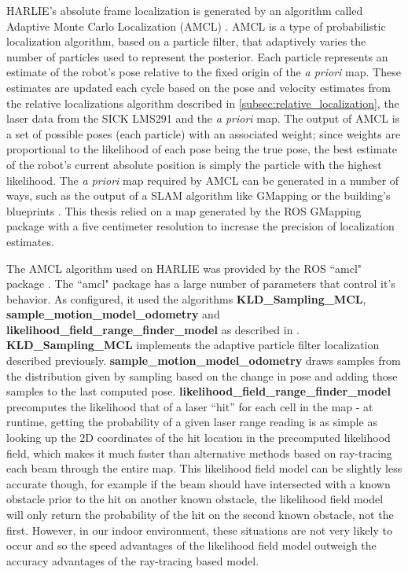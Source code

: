 HARLIE's absolute frame localization is generated by an algorithm called Adaptive Monte Carlo Localization (AMCL) \autocites{Dellaert_1999_533}{Fox01122003}{ProbRobotics}. AMCL is a type of probabilistic localization algorithm, based on a particle filter, that adaptively varies the number of particles used to represent the posterior. Each particle represents an estimate of the robot's pose relative to the fixed origin of the \emph{a priori} map. These estimates are updated each cycle based on the pose and velocity estimates from the relative localizations algorithm described in \autoref{subsec:relative_localization}, the laser data from the SICK LMS291 and the \emph{a priori} map. The output of AMCL is a set of possible poses (each particle) with an associated weight; since weights are proportional to the likelihood of each pose being the true pose, the best estimate of the robot's current absolute position is simply the particle with the highest likelihood. The \emph{a priori} map required by AMCL can be generated in a number of ways, such as the output of a SLAM algorithm like GMapping \autocite{Grisetti07improvedtechniques} or the building's blueprints \autocite{Fish2012}. This thesis relied on a map generated by the ROS GMapping package with a five centimeter resolution to increase the precision of localization estimates.

The AMCL algorithm used on HARLIE was provided by the ROS ``amcl" package \autocite{AMCLWiki}. The ``amcl" package has a large number of parameters that control it's behavior. As configured, it used the algorithms \textbf{KLD\_Sampling\_MCL}, \textbf{sample\_motion\_model\_odometry} and \textbf{likelihood\_field\_range\_finder\_model} as described in \autocite{ProbRobotics}. \textbf{KLD\_Sampling\_MCL} implements the adaptive particle filter localization described previously. \textbf{sample\_motion\_model\_odometry} draws samples from the distribution given by sampling based on the change in pose and adding those samples to the last computed pose. \textbf{likelihood\_field\_range\_finder\_model} precomputes the likelihood that of a laser ``hit'' for each cell in the map - at runtime, getting the probability of a given laser range reading is as simple as looking up the 2D coordinates of the hit location in the precomputed likelihood field, which makes it much faster than alternative methods based on ray-tracing each beam through the entire map. This likelihood field model can be slightly less accurate though, for example if the beam should have intersected with a known obstacle prior to the hit on another known obstacle, the likelihood field model will only return the probability of the hit on the second known obstacle, not the first. However, in our indoor environment, these situations are not very likely to occur and so the speed advantages of the likelihood field model outweigh the accuracy advantages of the ray-tracing based model.

